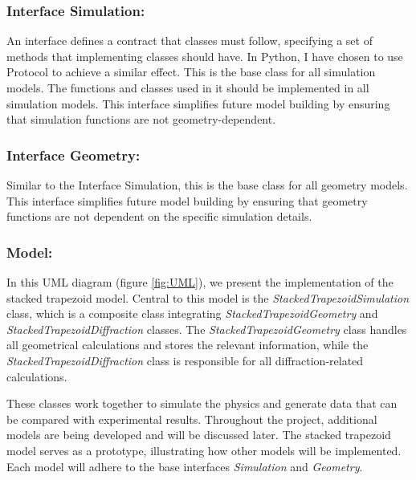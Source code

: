 \FloatBarrier

\subsubsection*{\textbf{Interface Simulation:}}

An interface defines a contract that classes must follow, specifying a set of methods that implementing 
classes should have. In Python, I have chosen to use Protocol to achieve a similar effect. This is 
the base class for all simulation models. The functions and classes used in it should be implemented 
in all simulation models. This interface simplifies future model building by ensuring that simulation 
functions are not geometry-dependent.

\subsubsection*{\textbf{Interface Geometry:}}

Similar to the Interface Simulation, this is the base class for all geometry models. This interface 
simplifies future model building by ensuring that geometry functions are not dependent on the specific 
simulation details.


\subsubsection*{\textbf{Model:}}

In this UML diagram (figure \ref{fig:UML}), we present the implementation of the stacked trapezoid model.
 Central to this model is the \textit{StackedTrapezoidSimulation} class, which is a composite class 
 integrating \textit{StackedTrapezoidGeometry} and \textit{StackedTrapezoidDiffraction} classes. The 
 \textit{StackedTrapezoidGeometry} class handles all geometrical calculations and stores the relevant 
 information, while the \textit{StackedTrapezoidDiffraction} class is responsible for all diffraction-related 
 calculations.

 \medskip

These classes work together to simulate the physics and generate data that can be compared with experimental
results. Throughout the project, additional models are being developed and will be discussed later. The stacked 
trapezoid model serves as a prototype, illustrating how other models will be implemented. Each model will 
adhere to the base interfaces \textit{Simulation} and \textit{Geometry}.


